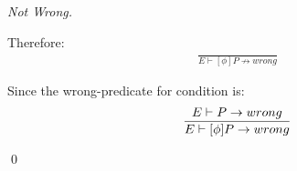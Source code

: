 \begin{proof}[Not Wrong]
\begin{description}
		Therefore:
		\begin{align*}
		\frac{}{E \vdash [\phi ]P \nrightarrow wrong}
		\end{align*}
		
		Since the wrong-predicate for condition is:
		\begin{align*}
		\frac{E \vdash P \rightarrow wrong}{E \vdash [\phi ]P \rightarrow wrong}
		\end{align*}
	\end{description}
	\qed
\end{proof}
